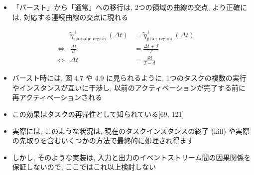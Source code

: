 \begin{frame}{}
    \begin{itemize}
        \item 「バースト」から「通常」への移行は, 2つの領域の曲線の交点, より正確には, 対応する連続曲線の交点に現れる

    \end{itemize}
    \begin{equation*}
        \begin{aligned}
                            & \tilde{\eta}_{\text {sporadic region }}^{+}(\Delta t) & =\tilde{\eta}_{\text {jitter region }}^{+}(\Delta t) \\
            \Leftrightarrow & \frac{\Delta t}{d}                                    & =\frac{\Delta t+J}{T}                                \\
            \Leftrightarrow & \Delta t                                              & =\frac{J d}{T-d}
        \end{aligned}
    \end{equation*}
\end{frame}

\begin{frame}{}
    \begin{itemize}
        \item バースト時には, 図 $4.7$ や 4.9 に見られるように, 1つのタスクの複数の実行やインスタンスが互いに干渉し, 以前のアクティベーションが完了する前に再アクティベーションされる
        \item この効果はタスクの再帰性として知られている[69, 121]
        \item 実際には, このような状況は, 現在のタスクインスタンスの終了 (kill) や実際の先取りを含むいくつかの方法で最終的に処理され得ます
        \item しかし, そのような実装は, 入力と出力のイベントストリーム間の因果関係を保証しないので, ここではこれ以上検討しない
    \end{itemize}
\end{frame}

